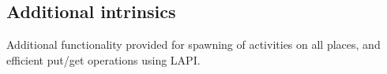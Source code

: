 \subsection{Additional intrinsics}
Additional functionality provided for spawning of activities on all
places, and efficient put/get operations using LAPI.

